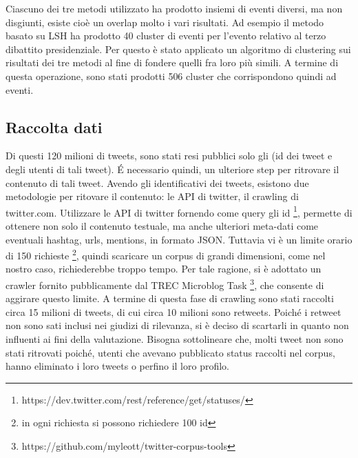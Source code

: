  
 Ciascuno dei tre metodi utilizzato ha prodotto insiemi di eventi diversi, ma non  disgiunti, esiste cioè   un overlap molto i vari risultati. Ad esempio il metodo basato su LSH ha prodotto 40 cluster di eventi per l'evento relativo al terzo dibattito presidenziale.
 Per questo è stato applicato un algoritmo di clustering sui risultati dei tre metodi al fine di fondere quelli fra loro più simili. A termine di questa operazione, sono stati prodotti 506 cluster che corrispondono quindi ad eventi.
\subsection{Raccolta dati}
Di questi 120 milioni di tweets, sono stati resi pubblici solo gli (id dei tweet e degli utenti di tali tweet).  \'E necessario quindi, un ulteriore step per ritrovare il contenuto di tali tweet.
Avendo gli identificativi dei tweets, esistono due metodologie per ritovare il contenuto: le API di twitter, il crawling di twitter.com.
Utilizzare le API di twitter fornendo come query gli id \footnote{https://dev.twitter.com/rest/reference/get/statuses/}, permette di ottenere non solo il contenuto testuale, ma anche ulteriori meta-dati come eventuali hashtag, urls, mentions, in formato JSON.
Tuttavia vi è un limite orario di 150 richieste \footnote{in ogni richiesta si possono richiedere 100 id}, quindi scaricare un corpus di grandi dimensioni, come nel nostro caso, richiederebbe troppo tempo. Per tale ragione, si è adottato un crawler fornito pubblicamente dal TREC Microblog Task \footnote{https://github.com/myleott/twitter-corpus-tools}, che consente di aggirare questo limite. A termine di questa fase di crawling sono stati raccolti circa 15 milioni di tweets, di cui  circa 10 milioni  sono retweets. Poiché i retweet non sono sati inclusi nei giudizi di rilevanza, si è deciso di scartarli in quanto non influenti ai fini della valutazione. Bisogna sottolineare che,  molti tweet non sono stati ritrovati poiché, utenti che avevano pubblicato status raccolti nel corpus, hanno eliminato i loro tweets o perfino il loro profilo.
 
 

 
